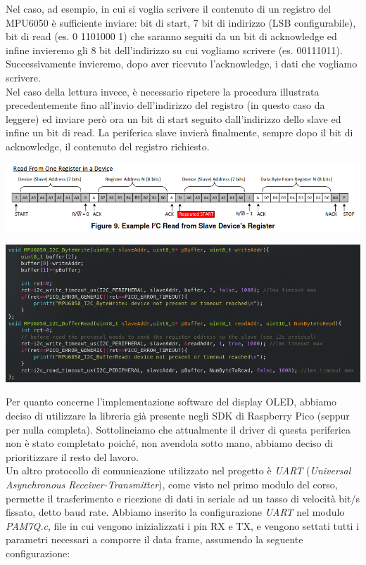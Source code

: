 \noindent Nel caso, ad esempio, in cui si voglia scrivere il contenuto di un
registro del MPU6050 è sufficiente inviare: bit di start, 7 bit di
indirizzo (LSB configurabile), bit di read (es. 0 1101000 1) che saranno
seguiti da un bit di acknowledge ed infine invieremo gli 8 bit
dell'indirizzo su cui vogliamo scrivere (es. 00111011). Successivamente
invieremo, dopo aver ricevuto l'acknowledge, i dati che vogliamo
scrivere.\\
Nel caso della lettura invece, è necessario ripetere la procedura
illustrata precedentemente fino all'invio dell'indirizzo del registro
(in questo caso da leggere) ed inviare però ora un bit di start seguito
dall'indirizzo dello slave ed infine un bit di read. La periferica slave
invierà finalmente, sempre dopo il bit di acknowledge, il contenuto del
registro richiesto.

\begin{center}
\includegraphics[scale=0.7]{figures/image39.png}
\captionsetup{type=figure}
\end{center}

\begin{center}
\includegraphics[scale=0.7]{figures/image35.png}
\captionsetup{type=figure}
\end{center}

\noindent Per quanto concerne l'implementazione software del display OLED, abbiamo
deciso di utilizzare la libreria già presente negli SDK di Raspberry
Pico (seppur per nulla completa). Sottolineiamo che attualmente il
driver di questa periferica non è stato completato poiché, non avendola
sotto mano, abbiamo deciso di prioritizzare il resto del lavoro.\\
Un altro protocollo di comunicazione utilizzato nel progetto è
\emph{UART} (\emph{Universal Asynchronous Receiver-Transmitter}), come
visto nel primo modulo del corso, permette il trasferimento e ricezione
di dati in seriale ad un tasso di velocità bit/s fissato, detto baud
rate. Abbiamo inserito la configurazione \emph{UART} nel modulo
\emph{PAM7Q.c}, file in cui vengono inizializzati i pin RX e TX, e
vengono settati tutti i parametri necessari a comporre il data frame,
assumendo la seguente configurazione:


